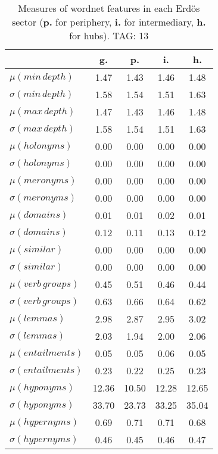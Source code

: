\begin{table}[h!]
\begin{center}
\begin{tabular}{| l | c | c | c | c |}\hline
 & g. & p. & i. & h. \\\hline
$\mu(min\,depth)$ & 1.47  & 1.43  & 1.46  & 1.48 \\\hline
$\sigma(min\,depth)$ & 1.58  & 1.54  & 1.51  & 1.63 \\\hline
$\mu(max\,depth)$ & 1.47  & 1.43  & 1.46  & 1.48 \\\hline
$\sigma(max\,depth)$ & 1.58  & 1.54  & 1.51  & 1.63 \\\hline
$\mu(holonyms)$ & 0.00  & 0.00  & 0.00  & 0.00 \\\hline
$\sigma(holonyms)$ & 0.00  & 0.00  & 0.00  & 0.00 \\\hline
$\mu(meronyms)$ & 0.00  & 0.00  & 0.00  & 0.00 \\\hline
$\sigma(meronyms)$ & 0.00  & 0.00  & 0.00  & 0.00 \\\hline
$\mu(domains)$ & 0.01  & 0.01  & 0.02  & 0.01 \\\hline
$\sigma(domains)$ & 0.12  & 0.11  & 0.13  & 0.12 \\\hline
$\mu(similar)$ & 0.00  & 0.00  & 0.00  & 0.00 \\\hline
$\sigma(similar)$ & 0.00  & 0.00  & 0.00  & 0.00 \\\hline
$\mu(verb\,groups)$ & 0.45  & 0.51  & 0.46  & 0.44 \\\hline
$\sigma(verb\,groups)$ & 0.63  & 0.66  & 0.64  & 0.62 \\\hline
$\mu(lemmas)$ & 2.98  & 2.87  & 2.95  & 3.02 \\\hline
$\sigma(lemmas)$ & 2.03  & 1.94  & 2.00  & 2.06 \\\hline
$\mu(entailments)$ & 0.05  & 0.05  & 0.06  & 0.05 \\\hline
$\sigma(entailments)$ & 0.23  & 0.22  & 0.25  & 0.23 \\\hline
$\mu(hyponyms)$ & 12.36  & 10.50  & 12.28  & 12.65 \\\hline
$\sigma(hyponyms)$ & 33.70  & 23.73  & 33.25  & 35.04 \\\hline
$\mu(hypernyms)$ & 0.69  & 0.71  & 0.71  & 0.68 \\\hline
$\sigma(hypernyms)$ & 0.46  & 0.45  & 0.46  & 0.47 \\\hline
\end{tabular}
\caption{Measures of wordnet features in each Erd\"os sector ({{\bf p.}} for periphery, {{\bf i.}} for intermediary, {{\bf h.}} for hubs). TAG: 13}
\end{center}
\end{table}